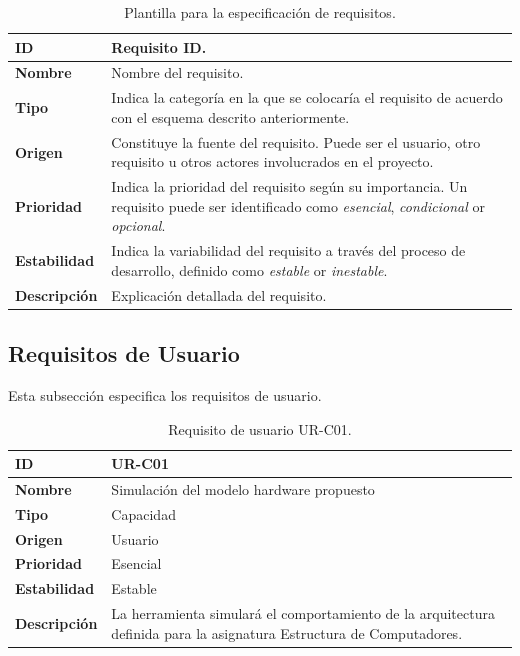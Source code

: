 \begin{center}
\begin{table}[htbp]
\centering
\begin{tabular}{@{}p{2.5cm} p{9cm}@{}} 
\toprule
\textbf{ID} 				& Requisito ID. \\
\midrule
\textbf{Nombre} 			& Nombre del requisito. \\
\midrule
\textbf{Tipo} 			& Indica la categoría en la que se colocaría el requisito de acuerdo con el esquema descrito anteriormente. \\
\midrule
\textbf{Origen} 			& Constituye la fuente del requisito. Puede ser el usuario, otro requisito u otros actores involucrados en el proyecto. \\
\midrule
\textbf{Prioridad}		& Indica la prioridad del requisito según su importancia. Un requisito puede ser identificado como \textit{esencial}, \textit{condicional} or \textit{opcional}. \\
\midrule
\textbf{Estabilidad} 		& Indica la variabilidad del requisito a través del proceso de desarrollo, definido como \textit{estable} or \textit{inestable}. \\
\midrule
\textbf{Descripción} 	& Explicación detallada del requisito. \\
\bottomrule
\end{tabular}
\caption{Plantilla para la especificación de requisitos.}
\label{tab:requirements_template}
\end{table}
\end{center}

\clearpage
\subsection{Requisitos de Usuario}

Esta subsección especifica los requisitos de usuario.

\begin{center}
\begin{table}[htbp]
\centering
\begin{tabular}{@{}p{2.5cm} p{9cm}@{}} 
\toprule
\textbf{ID} 				& UR-C01 \\
\midrule
\textbf{Nombre} 			& Simulación del modelo hardware propuesto\\
\midrule
\textbf{Tipo} 			& Capacidad \\
\midrule
\textbf{Origen} 			& Usuario \\
\midrule
\textbf{Prioridad}		& Esencial \\
\midrule
\textbf{Estabilidad} 		& Estable \\
\midrule
\textbf{Descripción} 	& La herramienta simulará el comportamiento de la arquitectura definida para la asignatura Estructura de Computadores. \\
\bottomrule
\end{tabular}
\caption{Requisito de usuario UR-C01.}
\label{tab:urc01}
\end{table}
\end{center}

